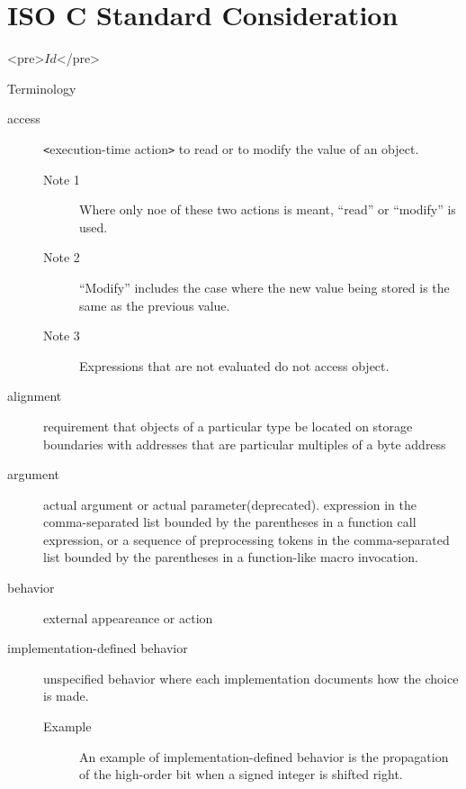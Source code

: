 \chapter{ISO C Standard Consideration}

\begin{rawhtml}
<pre>$Id$</pre>
\end{rawhtml}

\begin{faq}
 Terminology

\A 
\begin{description}
        \item[access] 
        \verb+<+execution-time action\verb+>+
        to read or to modify the
        value of an object.
        \begin{description}
                \item[Note 1] Where only noe of these two actions is
                meant, ``read'' or ``modify'' is used. 
                \item[Note 2] ``Modify'' includes the case where the new value
                being stored is the same as the previous value.
                \item[Note 3] Expressions that are not evaluated do not access 
                object.
        \end{description}

        \item[alignment] requirement that objects of a particular type be
        located on storage boundaries with addresses that are particular
        multiples of a byte address

        \item[argument] actual argument or actual parameter(deprecated).
        expression in the comma-separated list bounded by the parentheses
        in a function call expression, or a sequence of preprocessing tokens in
        the comma-separated list bounded by the parentheses in a function-like
        macro invocation.

        \item[behavior] external appeareance or action

        \item[implementation-defined behavior]
        unspecified behavior where each implementation documents how the
        choice is made.
        \begin{description}
                \item[Example] An example of implementation-defined behavior is
                        the propagation of the high-order bit when a signed 
                        integer is shifted right.
        \end{description}
        

\end{description}
\end{faq}
